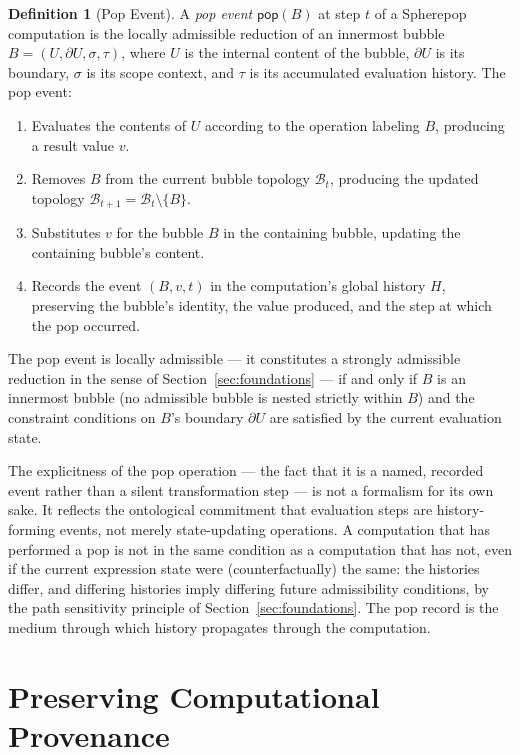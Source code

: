 \documentclass[12pt,openany]{book}
\theoremstyle{plain}
\theoremstyle{definition}
\newtheorem{definition}[theorem]{Definition}
\theoremstyle{remark}
\newcommand{\spop}[1]{\mathsf{pop}\!\left(#1\right)}
\begin{document}
\begin{definition}[Pop Event]
A \emph{pop event} $\spop{B}$ at step $t$ of a Spherepop computation is the locally admissible reduction of an innermost bubble $B = (U, \partial U, \sigma, \tau)$, where $U$ is the internal content of the bubble, $\partial U$ is its boundary, $\sigma$ is its scope context, and $\tau$ is its accumulated evaluation history. The pop event:
\begin{enumerate}[label=(\arabic*)]
  \item Evaluates the contents of $U$ according to the operation labeling $B$, producing a result value $v$.
  \item Removes $B$ from the current bubble topology $\mathcal{B}_t$, producing the updated topology $\mathcal{B}_{t+1} = \mathcal{B}_t \setminus \{B\}$.
  \item Substitutes $v$ for the bubble $B$ in the containing bubble, updating the containing bubble's content.
  \item Records the event $(B, v, t)$ in the computation's global history $H$, preserving the bubble's identity, the value produced, and the step at which the pop occurred.
\end{enumerate}
The pop event is locally admissible — it constitutes a strongly admissible reduction in the sense of Section~\ref{sec:foundations} — if and only if $B$ is an innermost bubble (no admissible bubble is nested strictly within $B$) and the constraint conditions on $B$'s boundary $\partial U$ are satisfied by the current evaluation state.
\end{definition}

The explicitness of the pop operation — the fact that it is a named, recorded event rather than a silent transformation step — is not a formalism for its own sake. It reflects the ontological commitment that evaluation steps are history-forming events, not merely state-updating operations. A computation that has performed a pop is not in the same condition as a computation that has not, even if the current expression state were (counterfactually) the same: the histories differ, and differing histories imply differing future admissibility conditions, by the path sensitivity principle of Section~\ref{sec:foundations}. The pop record is the medium through which history propagates through the computation.

\section{Preserving Computational Provenance}
\end{document}

